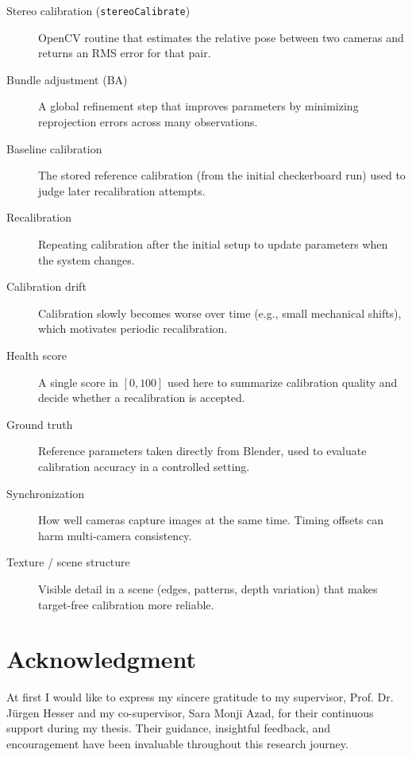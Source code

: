 \documentclass[12pt]{scrartcl}
\begin{document}
\begin{description}
\item[Stereo calibration (\texttt{stereoCalibrate})]
OpenCV routine that estimates the relative pose between two cameras and returns an RMS error for that pair.

\item[Bundle adjustment (BA)]
A global refinement step that improves parameters by minimizing reprojection errors across many observations.

\item[Baseline calibration]
The stored reference calibration (from the initial checkerboard run) used to judge later recalibration attempts.

\item[Recalibration]
Repeating calibration after the initial setup to update parameters when the system changes.

\item[Calibration drift]
Calibration slowly becomes worse over time (e.g., small mechanical shifts), which motivates periodic recalibration.

\item[Health score]
A single score in $[0,100]$ used here to summarize calibration quality and decide whether a recalibration is accepted.

\item[Ground truth]
Reference parameters taken directly from Blender, used to evaluate calibration accuracy in a controlled setting.

\item[Synchronization]
How well cameras capture images at the same time. Timing offsets can harm multi-camera consistency.

\item[Texture / scene structure]
Visible detail in a scene (edges, patterns, depth variation) that makes target-free calibration more reliable.

\end{description}


\cleardoublepage



\cleardoublepage
\section{Acknowledgment}

At first I would like to express my sincere gratitude to my supervisor, Prof. Dr. Jürgen Hesser and my co-supervisor, Sara Monji Azad, for their continuous support during my thesis. Their guidance, insightful feedback, and encouragement have been invaluable throughout this research journey.
\newline
\end{document}
